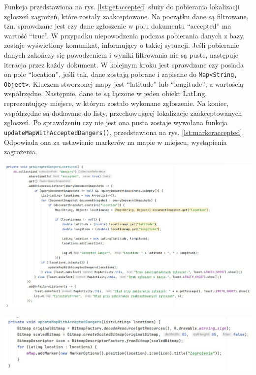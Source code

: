 Funkcja przedstawiona na rys. \ref{lst:getaccepted} służy do pobierania lokalizacji zgłoszeń zagrożeń, które zostały zaakceptowane. Na początku dane są filtrowane, tzn. sprawdzane jest czy dane zgłoszenie w polu dokumentu “accepted” ma wartość “true”. W przypadku niepowodzenia podczas pobierania danych z bazy, zostaje wyświetlony komunikat, informujący o takiej sytuacji. Jeśli pobieranie danych zakończy się powodzeniem i wyniki filtrowania nie są puste, następuje iteracja przez każdy dokument. W kolejnym kroku jest sprawdzane czy posiada on pole “location”, jeśli tak, dane zostają pobrane i zapisane do \verb|Map<String, Object>|. Kluczem stworzonej mapy jest “latitude” lub “longitude”, a wartością współrzędne. Następnie, dane te są łączone w jeden obiekt LatLng, reprezentujący miejsce, w którym zostało wykonane zgłoszenie. Na koniec, współrzędne są dodawane do listy, przechowującej lokalizacje zaakceptowanych zgłoszeń. Po sprawdzeniu czy nie jest ona pusta zostaje wywołana funkcja \verb|updateMapWithAcceptedDangers()|, przedstawiona na rys. \ref{lst:markeraccepted}. Odpowiada ona za ustawienie markerów na mapie w miejscu, wystąpienia zagrożenia. \\

\noindent
\begin{minipage}{\linewidth}
    \label{lst:getaccepted}
    \centering
    \includegraphics[width=0.8\linewidth]{img/kod/imp-getacceptedloc.jpg}
\end{minipage}

\noindent
\begin{minipage}{\linewidth}
    \label{lst:markeraccepted}
    \centering
    \includegraphics[width=0.8\linewidth]{img/kod/imp-updatemap.jpg}
\end{minipage}

